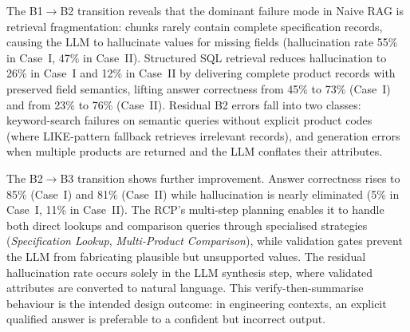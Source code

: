 \documentclass[largeformat]{interact}
\begin{document}
The B1$\rightarrow$B2 transition reveals that the dominant failure mode in Naive RAG is retrieval fragmentation: chunks rarely contain complete specification records, causing the LLM to hallucinate values for missing fields (hallucination rate 55\% in Case~I, 47\% in Case~II). Structured SQL retrieval reduces hallucination to 26\% in Case~I and 12\% in Case~II by delivering complete product records with preserved field semantics, lifting answer correctness from 45\% to 73\% (Case~I) and from 23\% to 76\% (Case~II). Residual B2 errors fall into two classes: keyword-search failures on semantic queries without explicit product codes (where LIKE-pattern fallback retrieves irrelevant records), and generation errors when multiple products are returned and the LLM conflates their attributes.

The B2$\rightarrow$B3 transition shows further improvement. Answer correctness rises to 85\% (Case~I) and 81\% (Case~II) while hallucination is nearly eliminated (5\% in Case~I, 11\% in Case~II). The RCP's multi-step planning enables it to handle both direct lookups and comparison queries through specialised strategies (\emph{Specification Lookup}, \emph{Multi-Product Comparison}), while validation gates prevent the LLM from fabricating plausible but unsupported values. The residual hallucination rate occurs solely in the LLM synthesis step, where validated attributes are converted to natural language. This verify-then-summarise behaviour is the intended design outcome: in engineering contexts, an explicit qualified answer is preferable to a confident but incorrect output.

\end{document}
